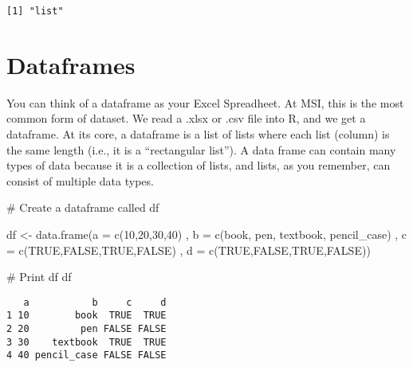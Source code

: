 \documentclass[
  letterpaper,
  DIV=11,
  numbers=noendperiod]{scrreprt}
\newenvironment{Shaded}{\begin{snugshade}}{\end{snugshade}}
\newcommand{\AttributeTok}[1]{\textcolor[rgb]{0.40,0.45,0.13}{#1}}
\newcommand{\CommentTok}[1]{\textcolor[rgb]{0.37,0.37,0.37}{#1}}
\newcommand{\ConstantTok}[1]{\textcolor[rgb]{0.56,0.35,0.01}{#1}}
\newcommand{\DecValTok}[1]{\textcolor[rgb]{0.68,0.00,0.00}{#1}}
\newcommand{\FunctionTok}[1]{\textcolor[rgb]{0.28,0.35,0.67}{#1}}
\newcommand{\NormalTok}[1]{\textcolor[rgb]{0.00,0.23,0.31}{#1}}
\newcommand{\OtherTok}[1]{\textcolor[rgb]{0.00,0.23,0.31}{#1}}
\newcommand{\StringTok}[1]{\textcolor[rgb]{0.13,0.47,0.30}{#1}}
\begin{document}
\begin{verbatim}
[1] "list"
\end{verbatim}

\section{Dataframes}\label{dataframes}

You can think of a dataframe as your Excel Spreadheet. At MSI, this is
the most common form of dataset. We read a .xlsx or .csv file into R,
and we get a dataframe. At its core, a dataframe is a list of lists
where each list (column) is the same length (i.e., it is a ``rectangular
list''). A data frame can contain many types of data because it is a
collection of lists, and lists, as you remember, can consist of multiple
data types.

\begin{Shaded}
\begin{Highlighting}[]
\CommentTok{\# Create a dataframe called df}

\NormalTok{df }\OtherTok{\textless{}{-}} \FunctionTok{data.frame}\NormalTok{(}\AttributeTok{a =} \FunctionTok{c}\NormalTok{(}\DecValTok{10}\NormalTok{,}\DecValTok{20}\NormalTok{,}\DecValTok{30}\NormalTok{,}\DecValTok{40}\NormalTok{)}
\NormalTok{                 , }\AttributeTok{b =} \FunctionTok{c}\NormalTok{(}\StringTok{\textquotesingle{}book\textquotesingle{}}\NormalTok{, }\StringTok{\textquotesingle{}pen\textquotesingle{}}\NormalTok{, }\StringTok{\textquotesingle{}textbook\textquotesingle{}}\NormalTok{, }\StringTok{\textquotesingle{}pencil\_case\textquotesingle{}}\NormalTok{)}
\NormalTok{                 , }\AttributeTok{c =} \FunctionTok{c}\NormalTok{(}\ConstantTok{TRUE}\NormalTok{,}\ConstantTok{FALSE}\NormalTok{,}\ConstantTok{TRUE}\NormalTok{,}\ConstantTok{FALSE}\NormalTok{)}
\NormalTok{                 , }\AttributeTok{d =} \FunctionTok{c}\NormalTok{(}\ConstantTok{TRUE}\NormalTok{,}\ConstantTok{FALSE}\NormalTok{,}\ConstantTok{TRUE}\NormalTok{,}\ConstantTok{FALSE}\NormalTok{))}

\CommentTok{\# Print df}
\NormalTok{df}
\end{Highlighting}
\end{Shaded}

\begin{verbatim}
   a           b     c     d
1 10        book  TRUE  TRUE
2 20         pen FALSE FALSE
3 30    textbook  TRUE  TRUE
4 40 pencil_case FALSE FALSE
\end{verbatim}
\end{document}
